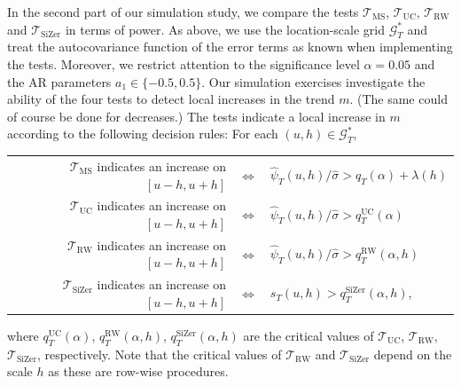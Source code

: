 In the second part of our simulation study, we compare the tests $\mathcal{T}_{\text{MS}}$, $\mathcal{T}_{\text{UC}}$, $\mathcal{T}_{\text{RW}}$ and $\mathcal{T}_{\text{SiZer}}$ in terms of power. As above, we use the location-scale grid $\mathcal{G}_T^*$ and treat the autocovariance function of the error terms as known when implementing the tests. Moreover, we restrict attention to the significance level $\alpha=0.05$ and the AR parameters $a_1 \in \{-0.5,0.5\}$. Our simulation exercises investigate the ability of the four tests to detect local increases in the trend $m$. (The same could of course be done for decreases.) The tests indicate a local increase in $m$ according to the following decision rules: For each $(u,h) \in \mathcal{G}_T^*$, 
\begin{center}
\begin{tabular}{rcl}
$\mathcal{T}_{\text{MS}}$ indicates an increase on $[u-h,u+h]$   & $\Longleftrightarrow$ & $\widehat{\psi}_T(u,h) / \widehat{\sigma} > q_T(\alpha) + \lambda(h)$ \\ 
$\mathcal{T}_{\text{UC}}$ indicates an increase on $[u-h,u+h]$   & $\Longleftrightarrow$ & $\widehat{\psi}_T(u,h) / \widehat{\sigma} > q_T^{\text{UC}}(\alpha)$ \\
$\mathcal{T}_{\text{RW}}$ indicates an increase on $[u-h,u+h]$   & $\Longleftrightarrow$ & $\widehat{\psi}_T(u,h) / \widehat{\sigma} > q_T^{\text{RW}}(\alpha,h)$ \\
$\mathcal{T}_{\text{SiZer}}$ indicates an increase on $[u-h,u+h]$ & $\Longleftrightarrow$ & $s_T(u,h) > q_T^{\text{SiZer}}(\alpha,h)$, 
\end{tabular}
\end{center}
where $q_T^{\text{UC}}(\alpha)$, $q_T^{\text{RW}}(\alpha,h)$, $q_T^{\text{SiZer}}(\alpha,h)$ are the critical values of $\mathcal{T}_{\text{UC}}$, $\mathcal{T}_{\text{RW}}$, $\mathcal{T}_{\text{SiZer}}$, respectively. Note that the critical values of $\mathcal{T}_{\text{RW}}$ and $\mathcal{T}_{\text{SiZer}}$ depend on the scale $h$ as these are row-wise procedures. 


